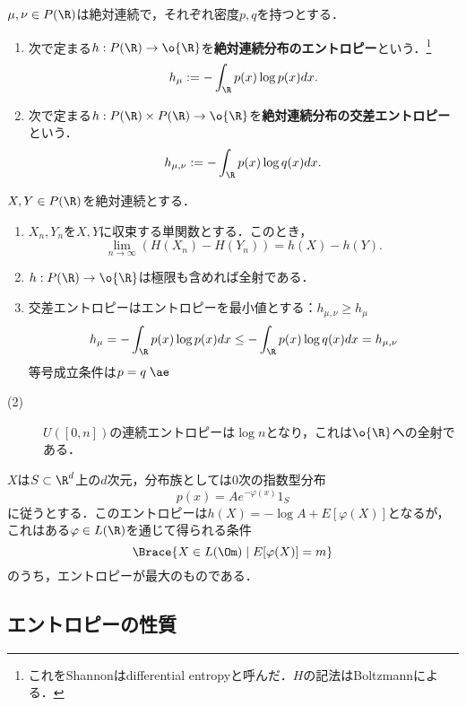 \documentclass[uplatex,dvipdfmx]{jsreport}
\begin{document}
\begin{definition}
    $\mu,\nu\in P(\R)$は絶対連続で，それぞれ密度$p,q$を持つとする．
    \begin{enumerate}
        \item 次で定まる$h:P(\R)\to\o{\R}$を\textbf{絶対連続分布のエントロピー}という．\footnote{これをShannonはdifferential entropyと呼んだ．$H$の記法はBoltzmannによる．}
        \[h_\mu:=-\int_\R p(x)\log p(x)dx.\]
        \item 次で定まる$h:P(\R)\times P(\R)\to\o{\R}$を\textbf{絶対連続分布の交差エントロピー}という．
        \[h_{\mu,\nu}:=-\int_\R p(x)\log q(x)dx.\]
    \end{enumerate}
\end{definition}
\begin{proposition}
    $X,Y\in P(\R)$を絶対連続とする．
    \begin{enumerate}
        \item $X_n,Y_n$を$X,Y$に収束する単関数とする．このとき，
        \[\lim_{n\to\infty}(H(X_n)-H(Y_n))=h(X)-h(Y).\]
        \item $h:P(\R)\to\o{\R}$は極限も含めれば全射である．
        \item 交差エントロピーはエントロピーを最小値とする：$h_{\mu,\nu}\ge h_{\mu}$
        \[h_\mu=-\int_\R p(x)\log p(x)dx\le-\int_\R p(x)\log q(x)dx=h_{\mu,\nu}\]
        等号成立条件は$p=q\;\ae$
    \end{enumerate}
\end{proposition}
\begin{Proof}\mbox{}
    \begin{description}
        \item[(2)] $U([0,n])$の連続エントロピーは$\log n$となり，これは$\o{\R}$への全射である．
    \end{description}
\end{Proof}
\begin{example}
    $X$は$S\subset\R^d$上の$d$次元，分布族としては$0$次の指数型分布
    \[p(x)=Ae^{-\varphi(x)}1_{S}\]
    に従うとする．このエントロピーは$h(X)=-\log A+E[\varphi(X)]$となるが，
    これはある$\varphi\in L(\R)$を通じて得られる条件
    \[\Brace{X\in L(\Om)\mid E[\varphi(X)]=m}\]
    のうち，エントロピーが最大のものである．
\end{example}

\subsection{エントロピーの性質}
\end{document}
